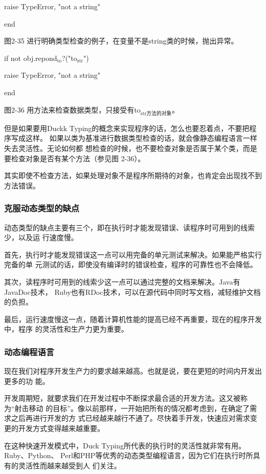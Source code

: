 \documentclass[11pt]{ctexart}
\begin{document}
raise TypeError, "not a string"

end

图2-35 进行明确类型检查的例子，在变量不是string类的时候，抛出异常。

if not obj.repond\(_{\text{to}}\)?("to\(_{\text{str}}\)")

raise TypeError, "not a string"

end

图2-36 用方法来检查数据类型，只接受有to\(_{\text{str方法的对象}}\)。

但是如果要用Duckk Typing的概念来实现程序的话，怎么也要忍着点，不要把程序写成这样。
如果以类为基准进行数据类型检查的话，就会像静态编程语言一样失去灵活性。无论如何都
想检查的时候，也不要检查对象是否属于某个类，而是要检查对象是否有某个方法（参见图
2-36）。

其实即使不检查方法，如果处理对象不是程序所期待的对象，也肯定会出现找不到方法错误。
\subsubsection{克服动态类型的缺点}
\label{sec:orgb919df7}

动态类型的缺点主要有三个，即在执行时才能发现错误、读程序时可用到的线索少，以及运
行速度慢。

首先，执行时才能发现错误这一点可以用完备的单元测试来解决。如果能严格实行完备的单
元测试的话，即使没有编译时的错误检查，程序的可靠性也不会降低。

其次，读程序时可用到的线索少这一点可以通过完整的文档来解决。Java有JavaDoc技术，
Ruby也有RDoc技术，可以在源代码中同时写文档，减轻维护文档的负担。

最后，运行速度慢这一点，随着计算机性能的提高已经不再重要，现在的程序开发中，程序
的灵活性和生产力更为重要。
\subsubsection{动态编程语言}
\label{sec:org19a5cba}

现在我们对程序开发生产力的要求越来越高。也就是说，要在更短的时间内开发出更多的功
能。

开发周期短，就要求我们在开发过程中不断探求最合适的开发方法。这又被称为“射击移动
的目标”。像以前那样，一开始把所有的情况都考虑到，在确定了需求之后再进行开发的方
式已经越来越行不通了。尽快着手开发，快速应对需求变更的开发方式变得越来越重要。

在这种快速开发模式中，Duck Typing所代表的执行时的灵活性就非常有用。Ruby、Python、
Perl和PHP等优秀的动态类型编程语言，因为它们在执行时所具有的灵活性而越来越受到人
们关注。
\end{document}
